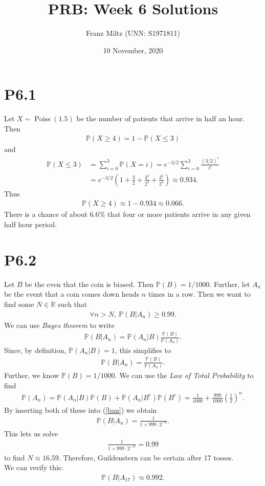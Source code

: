 \documentclass{article}
\newcommand{\R}{\mathbb{R}}
\renewcommand{\P}{\mathbb{P}}
\DeclareMathOperator{\Poiss}{Poiss}
\begin{document}
\title{PRB: Week 6 Solutions}
\author{Franz Miltz (UNN: S1971811)}
\date{10 November, 2020}
\maketitle
\section*{P6.1}
Let $X\sim\Poiss(1.5)$ be the number of patients that arrive in half an hour. Then
\begin{align*}
  \P(X \geq 4) = 1 - \P(X \leq 3)
\end{align*}
and
\begin{align*}
  \P(X \leq 3) &= \sum_{i=0}^3 \P(X=i)=e^{-3/2}\sum_{i=0}^3 \frac{(3/2)^i}{i!}\\
  &=e^{-3/2} (1+\frac{3}{2}+\frac{3^2}{2^3}+\frac{3^2}{2^4})
  \approx 0.934.
\end{align*}
Thus
\begin{align*}
  \P(X\geq 4) \approx 1 - 0.934 \approx 0.066.
\end{align*}
There is a chance of about $6.6\%$ that four or more patients arrive in
any given half hour period.
\section*{P6.2}
Let $B$ be the even that the coin is biased. Then $\P(B)=1/1000$. Further,
let $A_n$ be the event that a coin comes down heads $n$ times in a row.
Then we want to find some $N\in\R$ such that
\begin{align*}
  \forall n > N,\: \P(B|A_n)\geq 0.99.
\end{align*}
We can use \emph{Bayes theorem} to write
\begin{align*}
  \P(B|A_n) = \P(A_n|B)\frac{\P(B)}{\P(A_n)}.
\end{align*}
Since, by definition, $\P(A_n|B)=1$, this simplifies to
\begin{align}
  \label{ban}
  \P(B|A_n) = \frac{\P(B)}{\P(A_n)}.
\end{align}
Further, we know $\P(B)=1/1000$. We can use the \emph{Law of Total
Probability} to find
\begin{align*}
  \P(A_n)=\P(A_n|B)\P(B) + \P(A_n|B^c)\P(B^c)
  =\frac{1}{1000}+\frac{999}{1000}\left(\frac{1}{2}\right)^n.
\end{align*}
By inserting both of these into (\ref{ban}) we obtain
\begin{align*}
  \P(B|A_n) = \frac{1}{1+999\cdot 2^{-n}}.
\end{align*}
This lets us solve
\begin{align*}
  \frac{1}{1+999\cdot 2^{-N}} = 0.99
\end{align*}
to find $N\approx 16.59$. Therefore, Guildenstern can be certain after
17 tosses.\\
We can verify this:
\begin{align*}
  \P(B|A_{17}) \approx 0.992.
\end{align*}
\end{document}
